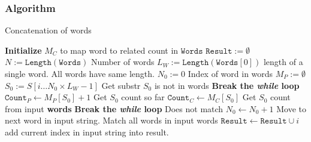 \documentclass[a4paper,12pt]{article}
\begin{document}
\subsubsection{Algorithm}
\setcounter{algorithm}{0}
\begin{algorithm}[H]
\caption{Concatenation of words}
\begin{algorithmic}[1]
\Statex
{}
\State \textbf{Initialize} $M_{C}$ to map word to related count in $\mathtt{Words}$
\State $\mathtt{Result} := \emptyset$
\State $N := \mathtt{Length}(\mathtt{Words})$ \Comment Number of words 
\State $L_W := \mathtt{Length}(\mathtt{Words}[0])$ \Comment length of a single word. All words have same length.
\State $N_0 := 0$ \Comment Index of word in words
\State $M_{P} := \emptyset$
\State $S_0 := S[i\ldots N_0\times L_W-1]$ \Comment  Get substr
 \Comment $S_0$ is not in words
\State \textbf{Break the \textit{while} loop}
\EndIf
\State $\mathtt{Count}_P \gets M_P[S_0] + 1$ \Comment Get $S_0$ count so far
\State $\mathtt{Count}_C \gets M_C[S_0]$ \Comment Get $S_0$ count from input \textbf{words}
\State \textbf{Break the \textit{while} loop} \Comment Does not match
\EndIf
\State $N_0 \gets N_0+1$ \Comment Move to next word in input string.
\EndWhile 
{} \Comment Match all words in input words
\State $\mathtt{Result} \gets \mathtt{Result} \cup i$ \Comment add current index in input string into result.
\EndIf
\EndFor
\EndProcedure
\Statex
\end{algorithmic}
\end{algorithm}
\end{document}
